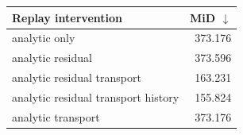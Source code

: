 \begin{tabular}{lr}
\toprule
Replay intervention & MiD $\downarrow$ \\
\midrule
analytic only & 373.176 \\
analytic residual & 373.596 \\
analytic residual transport & 163.231 \\
analytic residual transport history & 155.824 \\
analytic transport & 373.176 \\
\bottomrule
\end{tabular}
